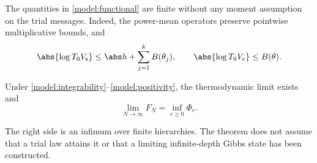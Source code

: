 The quantities in \eqref{model:functional} are finite without any moment
assumption on the trial messages. Indeed, the power-mean operators preserve
pointwise multiplicative bounds, and
\begin{equation}\label{model:trial-bounds}
 \abs{\log T_0V_{\rm s}}\le\abs h+\sum_{j=1}^k B(\theta_j),
 \qquad \abs{\log T_0V_{\rm e}}\le B(\theta).
\end{equation}

\begin{theorem}\label{main:theorem}
Under \eqref{model:integrability}--\eqref{model:positivity}, the thermodynamic
limit exists and
\begin{equation}\label{main:formula}
 \lim_{N\to\infty}F_N=\inf_{r\ge0}\Phi_r.
\end{equation}
\end{theorem}

The right side is an infimum over finite hierarchies. The theorem does not
assume that a trial law attains it or that a limiting infinite-depth
Gibbs state has been constructed.

